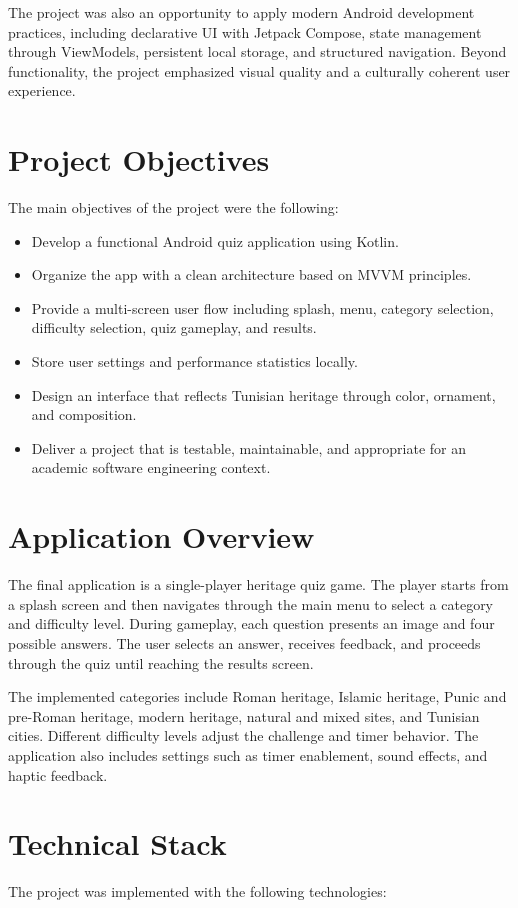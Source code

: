 \documentclass[12pt,a4paper]{article}
\begin{document}
The project was also an opportunity to apply modern Android development practices, including declarative UI with Jetpack Compose, state management through ViewModels, persistent local storage, and structured navigation. Beyond functionality, the project emphasized visual quality and a culturally coherent user experience.

\section{Project Objectives}
The main objectives of the project were the following:
\begin{itemize}[leftmargin=1.5em]
    \item Develop a functional Android quiz application using Kotlin.
    \item Organize the app with a clean architecture based on MVVM principles.
    \item Provide a multi-screen user flow including splash, menu, category selection, difficulty selection, quiz gameplay, and results.
    \item Store user settings and performance statistics locally.
    \item Design an interface that reflects Tunisian heritage through color, ornament, and composition.
    \item Deliver a project that is testable, maintainable, and appropriate for an academic software engineering context.
\end{itemize}

\section{Application Overview}
The final application is a single-player heritage quiz game. The player starts from a splash screen and then navigates through the main menu to select a category and difficulty level. During gameplay, each question presents an image and four possible answers. The user selects an answer, receives feedback, and proceeds through the quiz until reaching the results screen.

The implemented categories include Roman heritage, Islamic heritage, Punic and pre-Roman heritage, modern heritage, natural and mixed sites, and Tunisian cities. Different difficulty levels adjust the challenge and timer behavior. The application also includes settings such as timer enablement, sound effects, and haptic feedback.

\section{Technical Stack}
The project was implemented with the following technologies:
\end{document}
